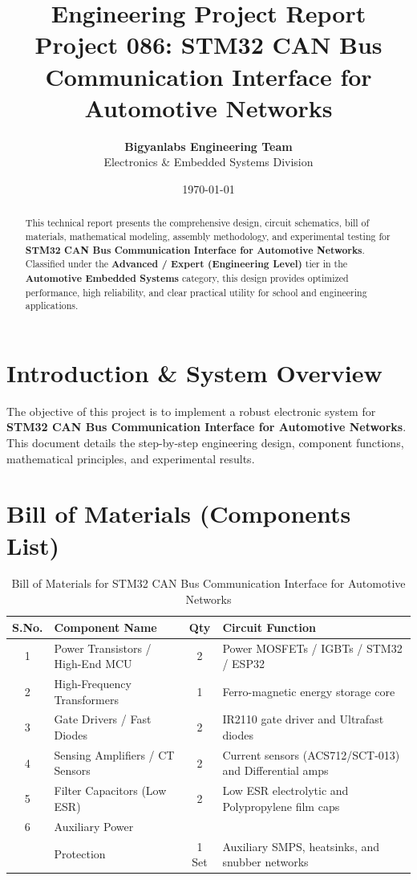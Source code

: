 \documentclass[11pt,a4paper]{article}
\title{\textbf{\Huge Engineering Project Report}\\[0.5em] \Large Project 086: STM32 CAN Bus Communication Interface for Automotive Networks}
\author{\textbf{Bigyanlabs Engineering Team}\\ Electronics \& Embedded Systems Division}
\date{\today}
\begin{document}
\maketitle
\thispagestyle{empty}

\begin{abstract}
This technical report presents the comprehensive design, circuit schematics, bill of materials, mathematical modeling, assembly methodology, and experimental testing for \textbf{STM32 CAN Bus Communication Interface for Automotive Networks}. Classified under the \textbf{Advanced / Expert (Engineering Level)} tier in the \textbf{Automotive Embedded Systems} category, this design provides optimized performance, high reliability, and clear practical utility for school and engineering applications.
\end{abstract}

\newpage
\tableofcontents
\newpage

\section{Introduction \& System Overview}
The objective of this project is to implement a robust electronic system for \textbf{STM32 CAN Bus Communication Interface for Automotive Networks}. This document details the step-by-step engineering design, component functions, mathematical principles, and experimental results.

\section{Bill of Materials (Components List)}
\begin{table}[h!]
\centering
\caption{Bill of Materials for STM32 CAN Bus Communication Interface for Automotive Networks}
\vspace{0.5em}
\begin{tabular}{clcp{7cm}}
\toprule
\textbf{S.No.} & \textbf{Component Name} & \textbf{Qty} & \textbf{Circuit Function} \\
\midrule
1 & Power Transistors / High-End MCU & 2 & Power MOSFETs / IGBTs / STM32 / ESP32 \\
2 & High-Frequency Transformers & 1 & Ferro-magnetic energy storage core \\
3 & Gate Drivers / Fast Diodes & 2 & IR2110 gate driver and Ultrafast diodes \\
4 & Sensing Amplifiers / CT Sensors & 2 & Current sensors (ACS712/SCT-013) and Differential amps \\
5 & Filter Capacitors (Low ESR) & 2 & Low ESR electrolytic and Polypropylene film caps \\
6 & Auxiliary Power \\& Protection & 1 Set & Auxiliary SMPS, heatsinks, and snubber networks \\
\bottomrule
\end{tabular}
\end{table}
\end{document}
